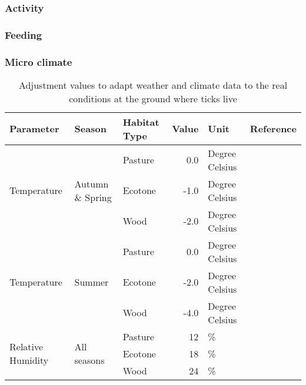 \documentclass[a4paper, 11pt]{scrartcl}
\begin{document}
\subsubsection{Activity}

\subsubsection{Feeding}


\subsubsection{Micro climate}

\begin{table}[h!]
\caption{Adjustment values to adapt weather and climate data to the real conditions at the ground where ticks live}
\label{tab:micro_climate_adjustments}
\begin{tabular}{@{}lllrll@{}}
\toprule
\textbf{Parameter}					& \textbf{Season} 					& \textbf{Habitat Type}  & \textbf{Value}  	& \textbf{Unit} & \textbf{Reference}  	\\
\midrule
\multirow{3}{*}{Temperature} 		& \multirow{3}{*}{Autumn \& Spring} & Pasture 				 &   0.0   			&   Degree Celsius	&            		    \\
									&									& Ecotone 				 &   -1.0 	  		&   Degree Celsius &	    				\\
									&					 				& Wood    				 &   -2.0   		&   Degree Celsius &	    				\\
\midrule
\multirow{3}{*}{Temperature} 		& \multirow{3}{*}{Summer}        	& Pasture 				 &   0.0    		&	Degree Celsius	&          				\\
									&				 	 				& Ecotone 				 &  -2.0    		&  	Degree Celsius	& ~\cite{Geiger.1995}  	\\
									&				 	 				& Wood	   				 &  -4.0    		&  	Degree Celsius	& ~\cite{Bonan.2016}   	\\
\midrule
\multirow{3}{*}{Relative Humidity}  & \multirow{3}{*}{All seasons}      & Pasture 				 &   12   			&  	\%			&            		    \\
									&				 					& Ecotone 				 &   18    			&   \%    		&					    \\
									&				 					& Wood    				 &   24    			&  	\%			& ~\cite{Boehnke.2017} 	\\
\bottomrule
\end{tabular}
\end{table}



\newpage
\printbibliography[heading = bibintoc, title = {Bibliography}]
\end{document}
